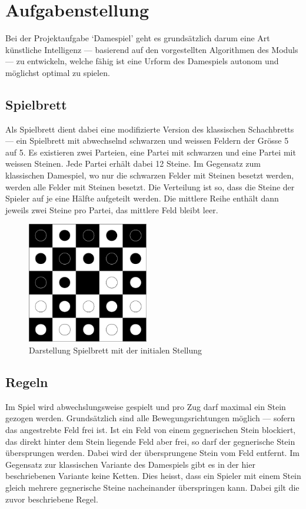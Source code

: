 \section{Aufgabenstellung}
\label{sec:basics}
Bei der Projektaufgabe `Damespiel' geht es grundsätzlich darum eine Art künstliche Intelligenz --- basierend auf den vorgestellten Algorithmen des Moduls --- zu entwickeln, welche fähig ist eine Urform des Damespiels autonom und möglichst optimal zu spielen.

\subsection{Spielbrett}
\label{subsec:board}
Als Spielbrett dient dabei eine modifizierte Version des klassischen Schachbretts --- ein Spielbrett mit abwechselnd schwarzen und weissen Feldern der Grösse 5 auf 5. Es existieren zwei Parteien, eine Partei mit schwarzen und eine Partei mit weissen Steinen. Jede Partei erhält dabei 12 Steine. Im Gegensatz zum klassischen Damespiel, wo nur die schwarzen Felder mit Steinen besetzt werden, werden alle Felder mit Steinen besetzt. Die Verteilung ist so, dass die Steine der Spieler auf je eine Hälfte aufgeteilt werden. Die mittlere Reihe enthält dann jeweils zwei Steine pro Partei, das mittlere Feld bleibt leer.

\begin{figure}[h]
\centering
\includegraphics[width=200px]{images/checkers_board.png}
\caption[width=100px]{Darstellung Spielbrett mit der initialen Stellung\protect\footnotemark}
\label{fig:checkersBoardInitial}
\end{figure}

\subsection{Regeln}
\label{subsec:rules}
Im Spiel wird abwechslungsweise gespielt und pro Zug darf maximal ein Stein gezogen werden. Grundsätzlich sind alle Bewegungsrichtungen möglich --- sofern das angestrebte Feld frei ist. Ist ein Feld von einem gegnerischen Stein blockiert, das direkt hinter dem Stein liegende Feld aber frei, so darf der gegnerische Stein übersprungen werden. Dabei wird der übersprungene Stein vom Feld entfernt. Im Gegensatz zur klassischen Variante des Damespiels gibt es in der hier beschriebenen Variante keine Ketten. Dies heisst, dass ein Spieler mit einem Stein gleich mehrere gegnerische Steine nacheinander überspringen kann. Dabei gilt die zuvor beschriebene Regel.\\

